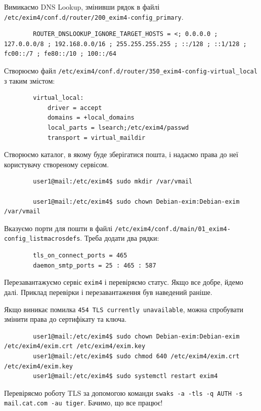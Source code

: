 \documentclass[14pt, a4paper]{extreport}
\begin{document}
	Вимикаємо DNS Lookup, змінивши рядок в файлі \texttt{/etc/exim4/conf.d/router/200\_exim4-config\_primary}.
	
	\begin{verbatim}
		ROUTER_DNSLOOKUP_IGNORE_TARGET_HOSTS = <; 0.0.0.0 ; 127.0.0.0/8 ; 192.168.0.0/16 ; 255.255.255.255 ; ::/128 ; ::1/128 ; fc00::/7 ; fe80::/10 ; 100::/64
	\end{verbatim}
	
	Створюємо файл \texttt{/etc/exim4/conf.d/router/350\_exim4-config-virtual\_local} з таким змістом:
	
	\begin{verbatim}
		virtual_local:
			driver = accept
			domains = +local_domains
			local_parts = lsearch;/etc/exim4/passwd
			transport = virtual_maildir
	\end{verbatim}
	
	Створюємо каталог, в якому буде зберігатися пошта, і надаємо права до неї користувачу створеному сервісом.
	
	\begin{verbatim}
		user1@mail:/etc/exim4$ sudo mkdir /var/vmail
		
		user1@mail:/etc/exim4$ sudo chown Debian-exim:Debian-exim /var/vmail
	\end{verbatim}
	
	Вказуємо порти для пошти в файлі \texttt{/etc/exim4/conf.d/main/01\_exim4-config\_listmacrosdefs}. Треба додати два рядки:
	
	\begin{verbatim}
		tls_on_connect_ports = 465
		daemon_smtp_ports = 25 : 465 : 587
	\end{verbatim}
	
	Перезавантажуємо сервіс \texttt{exim4} і перевіряємо статус. Якщо все добре, йдемо далі. Приклад перевірки і перезавантаження був наведений раніше.
	
	Якщо виникає помилка \texttt{454 TLS currently unavailable}, можна спробувати змінити права до сертифікату та ключа.
	
	\begin{verbatim}
		user1@mail:/etc/exim4$ sudo chown Debian-exim:Debian-exim /etc/exim4/exim.crt /etc/exim4/exim.key
		user1@mail:/etc/exim4$ sudo chmod 640 /etc/exim4/exim.crt /etc/exim4/exim.key
		user1@mail:/etc/exim4$ sudo systemctl restart exim4
	\end{verbatim}
	
	Перевіряємо роботу TLS за допомогою команди \texttt{swaks -a -tls -q AUTH -s mail.cat.com -au tiger}. Бачимо, що все працює!
	
\end{document}

